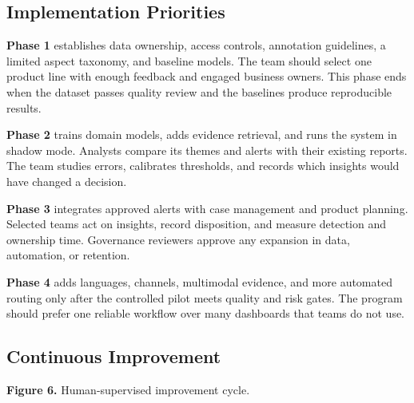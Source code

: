 \documentclass[11pt,a4paper,twoside]{article}
\begin{document}
\subsection{Implementation Priorities}

\textbf{Phase 1} establishes data ownership, access controls, annotation guidelines, a limited aspect taxonomy, and baseline models. The team should select one product line with enough feedback and engaged business owners. This phase ends when the dataset passes quality review and the baselines produce reproducible results.

\textbf{Phase 2} trains domain models, adds evidence retrieval, and runs the system in shadow mode. Analysts compare its themes and alerts with their existing reports. The team studies errors, calibrates thresholds, and records which insights would have changed a decision.

\textbf{Phase 3} integrates approved alerts with case management and product planning. Selected teams act on insights, record disposition, and measure detection and ownership time. Governance reviewers approve any expansion in data, automation, or retention.

\textbf{Phase 4} adds languages, channels, multimodal evidence, and more automated routing only after the controlled pilot meets quality and risk gates. The program should prefer one reliable workflow over many dashboards that teams do not use.

\subsection{Continuous Improvement}

\begin{center}

\vspace{0.05em}
{\small\textbf{Figure 6.} Human-supervised improvement cycle.}
\end{center}
\end{document}
